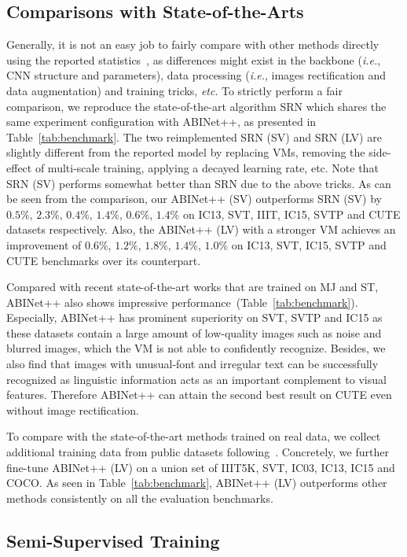 \documentclass[10pt,journal,compsoc]{IEEEtran}
\def\ie{{\it i.e.}\xspace}
\def\etc{{\it etc}\xspace}
\begin{document}
\subsection{Comparisons with State-of-the-Arts}


 Generally, it is not an easy job to fairly compare with other methods directly using the reported statistics~\cite{baek2019wrong}, as differences might exist in the backbone (\ie, CNN structure and parameters), data processing (\ie, images rectification and data augmentation) and training tricks, \etc. To strictly perform a fair comparison, we reproduce the state-of-the-art algorithm SRN which shares the same experiment configuration with ABINet++, as presented in Table~\ref{tab:benchmark}. The two reimplemented SRN (SV) and SRN (LV) are slightly different from the reported model by replacing VMs, removing the side-effect of multi-scale training, applying a decayed learning rate, etc. Note that SRN (SV) performs somewhat better than SRN due to the above tricks. As can be seen from the comparison, our ABINet++ (SV) outperforms SRN (SV) by $0.5\%$, $2.3\%$, $0.4\%$, $1.4\%$, $0.6\%$, $1.4\%$ on IC13, SVT, IIIT, IC15, SVTP and CUTE datasets respectively. Also, the ABINet++ (LV) with a stronger VM achieves an improvement of $0.6\%$, $1.2\%$, $1.8\%$, $1.4\%$, $1.0\%$ on IC13, SVT, IC15, SVTP and CUTE benchmarks over its counterpart.
 
 Compared with recent state-of-the-art works that are trained on MJ and ST, ABINet++ also shows impressive performance~(Table~\ref{tab:benchmark}). Especially, ABINet++ has prominent superiority on SVT, SVTP and IC15 as these datasets contain a large amount of low-quality images such as noise and blurred images, which the VM is not able to confidently recognize. Besides, we also find that images with unusual-font and irregular text can be successfully recognized as linguistic information acts as an important complement to visual features. Therefore ABINet++ can attain the second best result on CUTE even without image rectification.

To compare with the state-of-the-art methods trained on real data, we collect additional training data from public datasets following~\cite{qiao2021pimnet}. Concretely, we further fine-tune ABINet++ (LV) on a union set of IIIT5K, SVT, IC03, IC13, IC15 and COCO. As seen in Table~\ref{tab:benchmark}, ABINet++ (LV) outperforms other methods consistently on all the evaluation benchmarks.

\subsection{Semi-Supervised Training}
\end{document}
